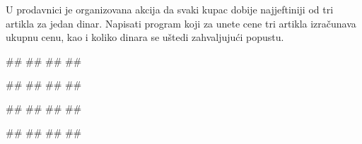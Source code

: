 \begin{Exercise}[label=v1.2_06] 
U prodavnici je organizovana akcija da svaki kupac dobije najjeftiniji od tri artikla za jedan dinar. Napisati program koji za unete cene tri artikla izračunava ukupnu cenu, kao i koliko dinara se uštedi zahvaljujući popustu. 

\begin{miditest}
\begin{upotreba}{1}
#\naslovInt#
##
##
##
\end{upotreba}
\end{miditest}
\begin{miditest}
\begin{upotreba}{2}
#\naslovInt#
##
##
##
\end{upotreba}
\end{miditest}

\begin{miditest}
\begin{upotreba}{3}
#\naslovInt#
##
##
##
\end{upotreba}
\end{miditest}
\begin{miditest}
\begin{upotreba}{4}
#\naslovInt#
##
##
##
\end{upotreba}
\end{miditest}

\end{Exercise}
\begin{Answer}[ref=v1.2_06]
\end{Answer}


